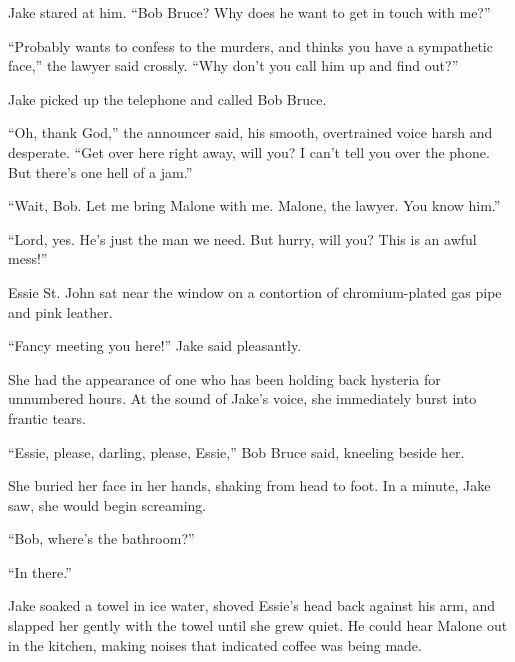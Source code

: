\documentclass{novel}
\begin{document}
Jake stared at him. “Bob Bruce? Why does he want to get in touch with me?”

“Probably wants to confess to the murders, and thinks you have a sympathetic face,” the lawyer said crossly. “Why don’t you call him up and find out?”

Jake picked up the telephone and called Bob Bruce.

“Oh, thank God,” the announcer said, his smooth, overtrained voice harsh and desperate. “Get over here right away, will you? I can’t tell you over the phone. But there’s one hell of a jam.”

“Wait, Bob. Let me bring Malone with me. Malone, the lawyer. You know him.”

“Lord, yes. He’s just the man we need. But hurry, will you? This is an awful mess!”

\vspace{2\nbs}
\clearpage
\thispagestyle{empty}

\begin{ChapterStart}
\vspace{3\nbs}
\end{ChapterStart}

Essie St. John sat near the window on a contortion of chromium-plated gas pipe and pink leather.

“Fancy meeting you here!” Jake said pleasantly.

She had the appearance of one who has been holding back hysteria for unnumbered hours. At the sound of Jake’s voice, she immediately burst into frantic tears.

“Essie, please, darling, please, Essie,” Bob Bruce said, kneeling beside her.

She buried her face in her hands, shaking from head to foot. In a minute, Jake saw, she would begin screaming.

“Bob, where’s the bathroom?”

“In there.”

Jake soaked a towel in ice water, shoved Essie’s head back against his arm, and slapped her gently with the towel until she grew quiet. He could hear Malone out in the kitchen, making noises that indicated coffee was being made.
\end{document}
